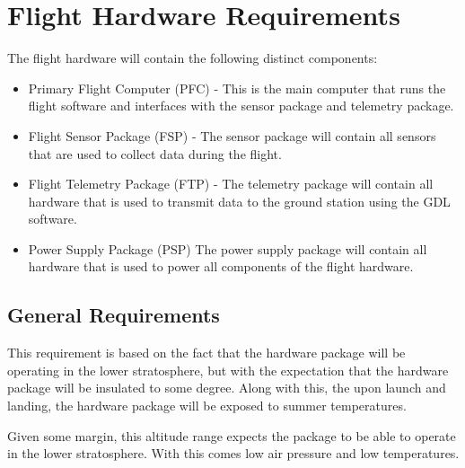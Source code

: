 
\section{Flight Hardware Requirements}

The flight hardware will contain the following distinct components:
\begin{itemize}
  \item Primary Flight Computer (PFC) -
    This is the main computer that runs the flight software and interfaces with the sensor package and telemetry package.
  \item Flight Sensor Package (FSP) -
    The sensor package will contain all sensors that are used to collect data during the flight.
  \item Flight Telemetry Package (FTP) -
    The telemetry package will contain all hardware that is used to transmit data to the ground station using the GDL software.
  \item Power Supply Package (PSP)
    The power supply package will contain all hardware that is used to power all components of the flight hardware.
\end{itemize}


\subsection{General Requirements}

This requirement is based on the fact that the hardware package will be operating in the lower stratosphere, but with the expectation that the hardware package will be insulated to some degree. Along with this, the upon launch and landing, the hardware package will be exposed to summer temperatures.


Given some margin, this altitude range expects the package to be able to operate in the lower stratosphere. With this comes low air pressure and low temperatures.


